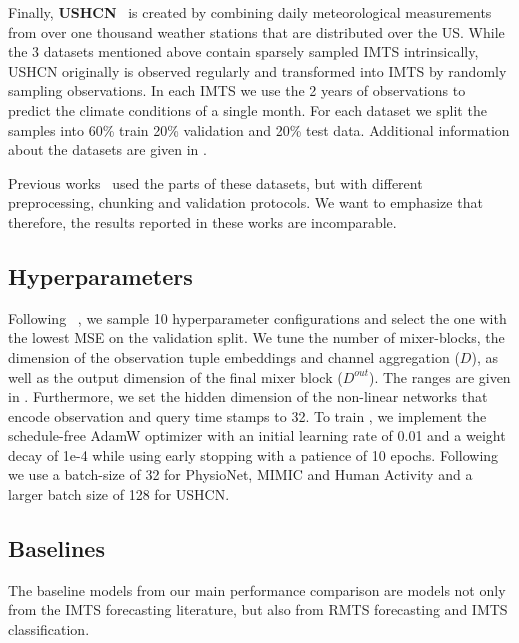 Finally, \textbf{USHCN}~\cite{Menne2006.US} is created by combining daily meteorological measurements from over one thousand weather stations that are distributed over the US.\@
While the 3 datasets mentioned above contain sparsely sampled IMTS intrinsically, USHCN originally is observed regularly and transformed into IMTS by randomly sampling observations. 
In each IMTS we use the 2 years of observations to predict the climate conditions of a single month.
For each dataset we split the samples into 60\% train 20\% validation and 20\% test data.
Additional information about the datasets are given in .

Previous works~\cite{DeBrouwer2019.GRUODEBayes, Bilos2021.Neural, Schirmer2022.Modeling,  Yalavarthi2023.Forecasting} used the parts of these datasets, but with different preprocessing, chunking and validation protocols.
We want to emphasize that therefore, the results reported in these works are incomparable. 


\subsection{Hyperparameters}
Following \citeauthor{Yalavarthi2023.Forecasting}~\cite{Yalavarthi2023.Forecasting}, we sample 10 hyperparameter configurations and select the one with the lowest MSE on the validation split.
We tune the number of mixer-blocks, the dimension of the observation tuple embeddings and channel aggregation ($D$), as well as the output dimension of the final mixer block ($D^{out}$). 
The ranges are given in .
Furthermore, we set the hidden dimension of the non-linear networks that encode observation and query time stamps to 32.
To train \model{}, we implement the schedule-free AdamW\cite{Defazio2024.Road,Kingma2017.Adam} optimizer with an initial learning rate of 0.01 and a weight decay of 1e-4 while
using early stopping with a patience of 10 epochs.
Following \citeauthor{Zhang.Irregular} we use a batch-size of 32 for PhysioNet, MIMIC and Human Activity and a larger batch size of 128 for USHCN.\@

\subsection{Baselines} 

The baseline models from our main performance comparison are models not only from the IMTS forecasting literature, but also from  
RMTS forecasting and IMTS classification. 


